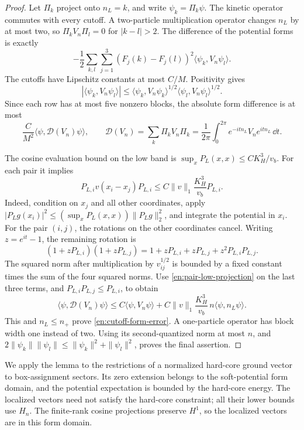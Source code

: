 \begin{proof}
Let \(\Pi_k\) project onto \(n_L=k\), and write
\(\psi_k=\Pi_k\psi\).  The kinetic operator commutes with every
cutoff.  A two-particle multiplication operator changes \(n_L\) by
at most two, so \(\Pi_kV_n\Pi_l=0\) for \(|k-l|>2\).
The difference of the potential forms is exactly
\[
 -\frac12\sum_{k,l}\sum_{j=1}^3
       (F_j(k)-F_j(l))^2\langle\psi_k,V_n\psi_l\rangle.
\]
The cutoffs have Lipschitz constants at most \(C/M\).
Positivity gives
\[
 |\langle\psi_k,V_n\psi_l\rangle|
 \le\langle\psi_k,V_n\psi_k\rangle^{1/2}
      \langle\psi_l,V_n\psi_l\rangle^{1/2}.
\]
Since each row has at most five nonzero blocks, the absolute form
difference is at most
\begin{equation}\label{en:dephased-error}
 \frac{C}{M^2}\langle\psi,\mathcal D(V_n)\psi\rangle,
 \qquad
 \mathcal D(V_n)=\sum_k\Pi_kV_n\Pi_k
       =\frac1{2\pi}\int_0^{2\pi}
          e^{-itn_L}V_ne^{itn_L}\,\dd t.
\end{equation}

The cosine evaluation bound on the low band is
\(\sup_x P_L(x,x)\le CK_H^3/v_b\).  For each pair it implies
\begin{equation}\label{en:pair-low-projection}
 P_{L,i}v(x_i-x_j)P_{L,i}
       \le C\|v\|_1\frac{K_H^3}{v_b}P_{L,i}.
\end{equation}
Indeed, condition on \(x_j\) and all other coordinates, apply
\(|P_Lg(x_i)|^2\le(\sup_xP_L(x,x))\|P_Lg\|_2^2\), and
integrate the potential in \(x_i\).
For the pair \((i,j)\), the rotations on the other coordinates cancel.
Writing \(z=e^{it}-1\), the remaining rotation is
\[
 (1+zP_{L,i})(1+zP_{L,j})
   =1+zP_{L,i}+zP_{L,j}+z^2P_{L,i}P_{L,j}.
\]
The squared norm after multiplication by \(v_{ij}^{1/2}\) is bounded
by a fixed constant times the sum of the four squared norms.
Use \eqref{en:pair-low-projection} on the last three terms, and
\(P_{L,i}P_{L,j}\le P_{L,i}\), to obtain
\[
 \langle\psi,\mathcal D(V_n)\psi\rangle
 \le C\langle\psi,V_n\psi\rangle
      +C\|v\|_1\frac{K_H^3}{v_b}\,
                       n\langle\psi,n_L\psi\rangle.
\]
This and \(n_L\le n_+\) prove
\eqref{en:cutoff-form-error}.  A one-particle operator has block
width one instead of two.  Using its second-quantized norm at most
\(n\), and \(2\|\psi_k\|\|\psi_l\|\le
\|\psi_k\|^2+\|\psi_l\|^2\), proves the final assertion.
\end{proof}

We apply the lemma to the restrictions of a normalized hard-core ground
vector to box-assignment sectors.  Its zero extension belongs to the
soft-potential form domain, and the potential expectation is bounded by
the hard-core energy.  The localized vectors need not satisfy the hard-core
constraint; all their lower bounds use \(H_n\).  The finite-rank
cosine projections preserve \(H^1\), so the localized vectors are
in this form domain.

